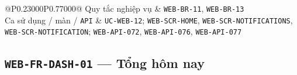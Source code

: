 \begin{longtable}{@{}P{0.23000\SRSWidth}P{0.77000\SRSWidth}@{}}
Quy tắc nghiệp vụ & \texttt{WEB-\allowbreak{}BR-\allowbreak{}11}, \texttt{WEB-\allowbreak{}BR-\allowbreak{}13} \\[3pt]
Ca sử dụng /\allowbreak{} màn /\allowbreak{} \texttt{API} & \texttt{UC-\allowbreak{}WEB-\allowbreak{}12}; \texttt{WEB-\allowbreak{}SCR-\allowbreak{}HOME}, \texttt{WEB-\allowbreak{}SCR-\allowbreak{}NOTIFICA\allowbreak{}TIONS}, \texttt{WEB-\allowbreak{}SCR-\allowbreak{}NOTIFICA\allowbreak{}TION}; \texttt{WEB-\allowbreak{}API-\allowbreak{}072}, \texttt{WEB-\allowbreak{}API-\allowbreak{}076}, \texttt{WEB-\allowbreak{}API-\allowbreak{}077} \\[3pt]
\end{longtable}
\endgroup

\subsection{\texttt{WEB-\allowbreak{}FR-\allowbreak{}DASH-\allowbreak{}01} — Tổng hôm nay}
\begingroup
\fontsize{9.5}{12}\selectfont
\setlength{\SRSWidth}{\dimexpr\linewidth-2\tabcolsep\relax}
